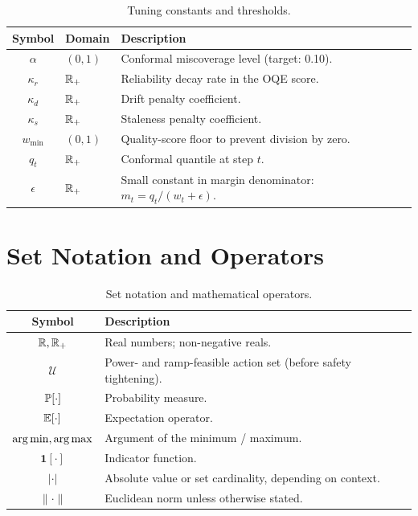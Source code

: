 \begin{longtable}{@{}clp{8.2cm}@{}}
\caption{Tuning constants and thresholds.}\label{tab:notation-tuning}\\
\toprule
\textbf{Symbol} & \textbf{Domain} & \textbf{Description} \\
\midrule
\endfirsthead
\bottomrule
\endfoot
$\alpha$      & $(0,1)$  & Conformal miscoverage level (target: 0.10). \\
$\kappa_r$    & $\mathbb{R}_+$   & Reliability decay rate in the OQE score. \\
$\kappa_d$    & $\mathbb{R}_+$   & Drift penalty coefficient. \\
$\kappa_s$    & $\mathbb{R}_+$   & Staleness penalty coefficient. \\
$w_{\min}$    & $(0,1)$  & Quality-score floor to prevent division by zero. \\
$q_t$         & $\mathbb{R}_+$   & Conformal quantile at step $t$. \\
$\epsilon$    & $\mathbb{R}_+$   & Small constant in margin denominator: $m_t = q_t/(w_t + \epsilon)$. \\
\end{longtable}

\section{Set Notation and Operators}

\begin{longtable}{@{}cp{10.5cm}@{}}
\caption{Set notation and mathematical operators.}\label{tab:notation-ops}\\
\toprule
\textbf{Symbol} & \textbf{Description} \\
\midrule
\endfirsthead
\bottomrule
\endfoot
$\mathbb{R}, \mathbb{R}_+$           & Real numbers; non-negative reals. \\
$\mathcal{U}$        & Power- and ramp-feasible action set (before safety tightening). \\
$\operatorname{\mathbb{P}}[\cdot]$       & Probability measure. \\
$\mathbb{E}[\cdot]$          & Expectation operator. \\
$\operatorname*{arg\,min}, \operatorname*{arg\,max}$   & Argument of the minimum / maximum. \\
$\mathbf{1}[\cdot]$  & Indicator function. \\
$|\cdot|$            & Absolute value or set cardinality, depending on context. \\
$\|\cdot\|$          & Euclidean norm unless otherwise stated. \\
\end{longtable}
